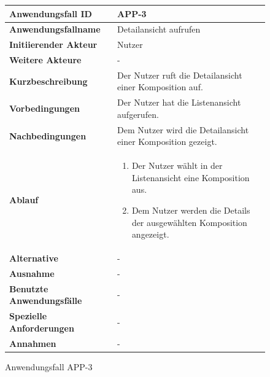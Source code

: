 \begin{figure}[h]
	\centering
	\begin{tabularx}{\textwidth}{ X | X }
		\textbf{Anwendungsfall ID} & APP-3 \\ \hline
		\textbf{Anwendungsfallname} & Detailansicht aufrufen \\ \hline
		\textbf{Initiierender Akteur} & Nutzer \\ \hline
		\textbf{Weitere Akteure} & -  \\ \hline
		\textbf{Kurzbeschreibung} & Der Nutzer ruft die Detailansicht einer Komposition auf.  \\ \hline
		\textbf{Vorbedingungen} & Der Nutzer hat die Listenansicht aufgerufen.  \\ \hline
		\textbf{Nachbedingungen} & Dem Nutzer wird die Detailansicht einer Komposition gezeigt.  \\ \hline
		\textbf{Ablauf} &
		\begin{enumerate}
			\item Der Nutzer wählt in der Listenansicht eine Komposition aus.
			\item Dem Nutzer werden die Details der ausgewählten Komposition angezeigt.
		\end{enumerate} \\ \hline
		\textbf{Alternative} &
		-  \\ \hline
		\textbf{Ausnahme} &
		- \\ \hline
		\textbf{Benutzte Anwendungsfälle} & - \\ \hline
		\textbf{Spezielle Anforderungen} & - \\ \hline
		\textbf{Annahmen} & -
	\end{tabularx}
	\caption{Anwendungsfall APP-3}
	\label{fig:anwendungsfall-app-tabelle-APP-3}
\end{figure}

\newpage


